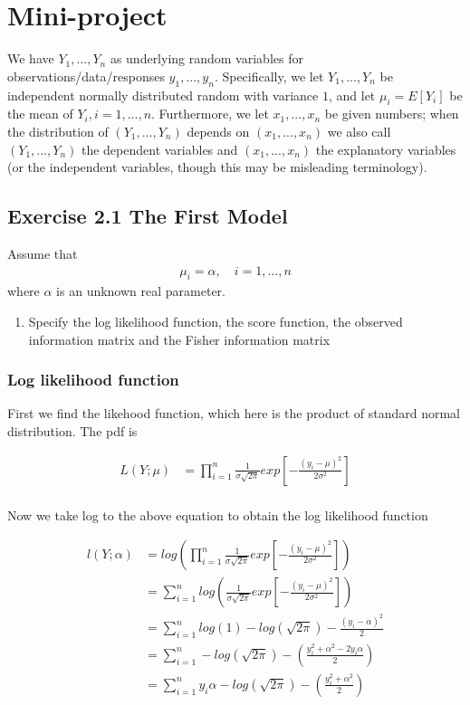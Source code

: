 \newpage
\section*{Mini-project}
We have $Y_1,...,Y_n$ as underlying random variables for observations/data/responses $y_1,...,y_n$.
Specifically, we let $Y_1,...,Y_n$ be independent normally distributed random with variance $1$, and let $\mu_i= E[Y_i]$ be the mean of $Y_i, i= 1,...,n$.
Furthermore, we let $x_1,...,x_n$ be given numbers; when the distribution of $(Y_1,...,Y_n)$ depends on $(x_1,...,x_n)$ we also call $(Y_1,...,Y_n)$ the dependent variables and $(x_1,...,x_n)$ the explanatory variables (or the independent variables, though this may be misleading terminology).

\subsection*{Exercise 2.1 The First Model}

Assume that
\begin{align*}
    \mu_i = \alpha, \quad i = 1, \ldots,n
\end{align*}
where $\alpha$ is an unknown real parameter. 

\begin{enumerate}
    \item Specify the log likelihood function, the score function, the observed information matrix and the Fisher information matrix
\end{enumerate}

\subsubsection{Log likelihood function}
First we find the likehood function, which here is the product of standard normal distribution. The pdf is 

\begin{align*}
   L(Y;\mu) &= \prod_{i=1}^n \frac{1}{\sigma \sqrt{2 \pi}}exp\left[-\frac{(y_i -\mu)^2}{2 \sigma^2}\right]\\
\end{align*}

Now we take log to the above equation to obtain the log likelihood function

\begin{align*}
   l(Y;\alpha) &= log \left( \prod_{i=1}^n \frac{1}{\sigma \sqrt{2 \pi}}exp\left[-\frac{(y_i -\mu)^2}{2 \sigma^2}\right] \right)\\
   &= \sum_{i = 1}^n log\left( \frac{1}{\sigma \sqrt{2 \pi}}exp\left[-\frac{(y_i - \mu)^2}{2 \sigma^2}\right] \right)\\
   &= \sum_{i = 1}^n log(1) - log(\sqrt{2 \pi}) - \frac{(y_i - \alpha)^2}{2}\\
   &= \sum_{i = 1}^n - log\left( \sqrt{2 \pi}\right) - \left(\frac{y_i^2 + \alpha^2 - 2y_i\alpha}{2}\right)\\
   &= \sum_{i = 1}^n y_i \alpha - log\left( \sqrt{2 \pi}\right) - \left( \frac{y_i^2 + \alpha^2}{2} \right)
\end{align*}

